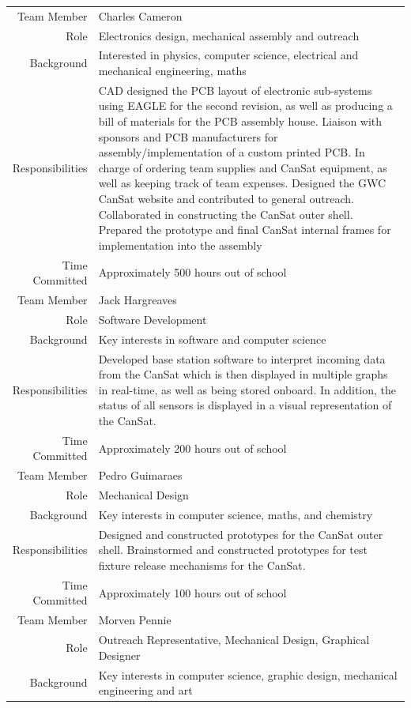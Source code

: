 \documentclass[]{report}
\begin{document}
\begin{center}
\begin{longtable}{rp{13cm}}
			\hline
			Team Member&Charles Cameron \\
			Role&Electronics design, mechanical assembly and outreach \\
			Background&Interested in physics, computer science, electrical and mechanical engineering, maths \\
			Responsibilities&CAD designed the PCB layout of electronic sub-systems using EAGLE for the second revision, as well as producing a bill of materials for the PCB assembly house. Liaison with sponsors and PCB manufacturers for assembly/implementation of a custom printed PCB. In charge of ordering team supplies and CanSat equipment, as well as keeping track of team expenses. Designed the GWC CanSat website and contributed to general outreach. Collaborated in constructing the CanSat outer shell.
			Prepared the prototype and final CanSat internal frames for implementation into the assembly \\
			Time Committed&Approximately 500 hours out of school\\
			\hline
			Team Member&Jack Hargreaves \\
			Role&Software Development \\
			Background&Key interests in software and computer science \\
			Responsibilities&Developed base station software to interpret incoming data from the CanSat which is then displayed in multiple graphs in real-time, as well as being stored onboard. In addition, the status of all sensors is displayed in a visual representation of the CanSat.\\
			Time Committed&Approximately 200 hours out of school\\
			\hline
			Team Member&Pedro Guimaraes \\
			Role&Mechanical Design \\
			Background&Key interests in computer science, maths, and chemistry \\
			Responsibilities&Designed and constructed prototypes for the CanSat outer shell. Brainstormed and constructed prototypes for test fixture release mechanisms for the CanSat.\\
			Time Committed&Approximately 100 hours out of school\\
			\hline
			Team Member&Morven Pennie \\
			Role&Outreach Representative, Mechanical Design, Graphical Designer \\
			Background&Key interests in computer science, graphic design, mechanical engineering and art \\

\end{longtable}
\end{center}
\end{document}
